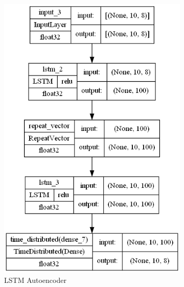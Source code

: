 \documentclass[a4paper,12pt]{report}
\theoremstyle{definitionNODot}
\begin{document}
\begin{figure}[H]
\begin{subfigure}[b]{0.3\textwidth}
			\includegraphics[width=\textwidth]{plot_model_lstm_ae_model.png}
			\caption{LSTM Autoencoder}
			\label{fig:plot_model_lstm_ae_model}
		\end{subfigure}
		\hfill
		\begin{subfigure}[b]{0.5\textwidth}
			\centering

\end{subfigure}
\end{figure}
\end{document}
